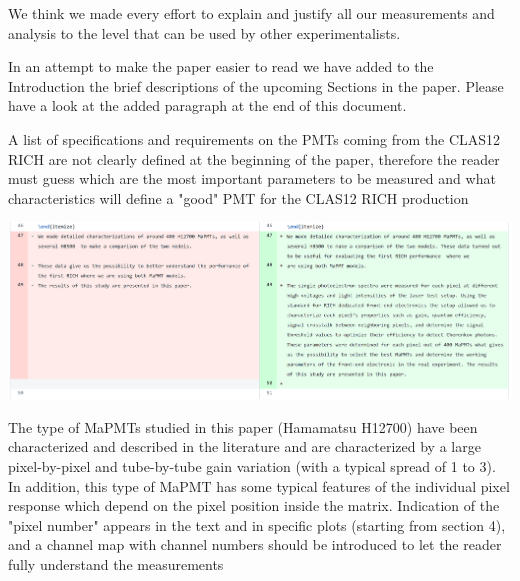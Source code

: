 \documentclass[11pt]{report}
\begin{document}
We think we made every effort to explain and justify all our measurements and analysis to the level that can be used by other experimentalists.

In an attempt to make the paper easier to read we have added to the Introduction the brief descriptions of the upcoming Sections in the paper. Please have a look at the added paragraph at the end of this document. 


\begin{tcolorbox}[enlarge top by=2em,colbacktitle=red!60!white,colframe=black!80!white,left=0pt,right=0pt,top=0pt,bottom=0pt,boxrule=0.3pt,title=\bfseries2.02]
A list of specifications and requirements on the PMTs coming from the CLAS12 RICH are not clearly defined at the beginning of the paper, therefore the reader must guess which are the most important parameters to be measured and what characteristics will define a "good" PMT for the CLAS12 RICH production
\end{tcolorbox}

\includegraphics[width=\linewidth]{round1/2.02.png}


\begin{tcolorbox}[enlarge top by=2em,colbacktitle=red!60!white,colframe=black!80!white,left=0pt,right=0pt,top=0pt,bottom=0pt,boxrule=0.3pt,title=\bfseries2.03]
The type of MaPMTs studied in this paper (Hamamatsu H12700) have been characterized and described in the literature and are characterized by a large pixel-by-pixel and tube-by-tube gain variation (with a typical spread of 1 to 3). In addition, this type of MaPMT has some typical features of the individual pixel response which depend on the pixel position inside the matrix. Indication of the "pixel number" appears in the text and in specific plots (starting from section 4), and a channel map with channel numbers should be introduced to let the reader fully understand the measurements
\end{tcolorbox}
\end{document}
